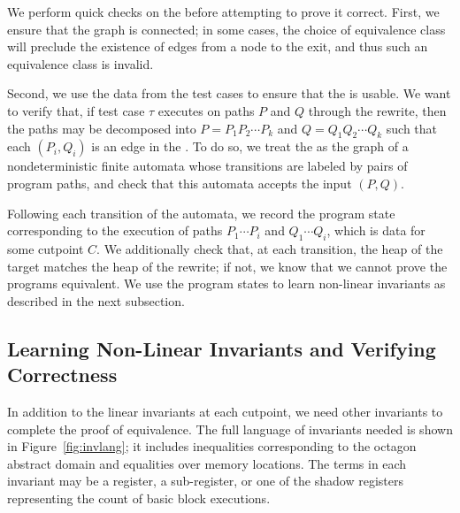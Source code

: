 We perform quick checks on the \bisimrep{} before attempting to prove
it correct. First, we ensure that the graph is connected; in some
cases, the choice of equivalence class will preclude the existence of
edges from a node to the exit, and thus such an equivalence class is
invalid.

Second, we use the data from the test cases to ensure that the
\bisimrep{} is usable. We want to verify that, if test case $\tau$
executes on paths $P$ and $Q$ through the rewrite, then the paths
may be decomposed into $P = P_1P_2\dotsm P_k$ and $Q = Q_1Q_2\dotsm
Q_k$ such that each $(P_i, Q_i)$ is an edge in the \bisimrep. To do
so, we treat the \bisimrep{} as the graph of a nondeterministic finite
automata whose transitions are labeled by pairs of program paths, and
check that this automata accepts the input $(P, Q)$. 

Following each transition of the automata, we record the program state
corresponding to the execution of paths $P_1\dotsm P_i$ and $Q_1
\dotsm Q_i$, which is data for some cutpoint $C$. We additionally
check that, at each transition, the heap of the target matches the
heap of the rewrite; if not, we know that we cannot prove the programs
equivalent. We use the program states to learn non-linear invariants
as described in the next subsection.

\subsection{Learning Non-Linear Invariants and Verifying Correctness} \label{algstep6}

In addition to the linear invariants at each cutpoint, we need other
invariants to complete the proof of equivalence. The full language
of invariants needed is shown in Figure~\ref{fig:invlang}; it includes
inequalities corresponding to the octagon abstract domain
and equalities over memory locations. The terms in each invariant
may be a register, a sub-register, or one of the shadow registers
representing the count of basic block executions.  

